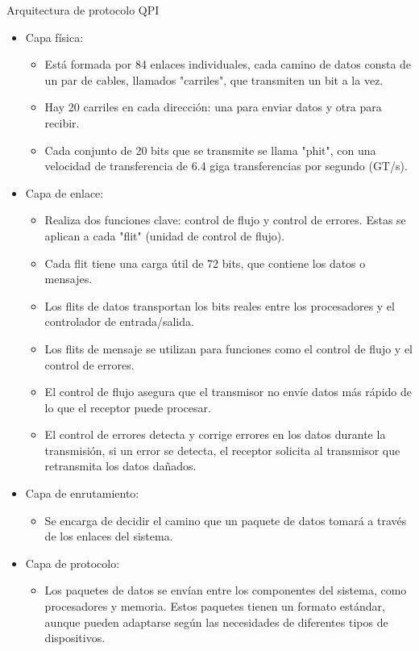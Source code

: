 \documentclass[presentation]{beamer}
\begin{document}
\begin{frame}[label={sec:org723b50a}]{Arquitectura de protocolo QPI}
\begin{itemize}
\item \alert{\alert{Capa física:}}
\begin{itemize}
\item Está formada por 84 enlaces individuales, cada camino de datos consta de un par de cables,
llamados "carriles", que transmiten un bit a la vez.
\item Hay 20 carriles en cada dirección: una para enviar datos y otra para recibir.
\item Cada conjunto de 20 bits que se transmite se llama "phit", con una velocidad de transferencia
de 6.4 giga transferencias por segundo (GT/s).
\end{itemize}
\item \alert{\alert{Capa de enlace:}}
\begin{itemize}
\item Realiza dos funciones clave: control de flujo y control de errores.
Estas se aplican a cada "flit" (unidad de control de flujo).
\item Cada flit tiene una carga útil de 72 bits, que contiene los datos o mensajes.
\item Los flits de datos transportan los bits reales entre los procesadores y el
controlador de entrada/salida.
\item Los flits de mensaje se utilizan para funciones como el control de flujo y
el control de errores.
\item El control de flujo asegura que el transmisor no envíe datos más rápido de
lo que el receptor puede procesar.
\item El control de errores detecta y corrige errores en los datos durante la
transmisión, si un error se detecta, el receptor solicita al transmisor
 que retransmita los datos dañados.
\end{itemize}
\item \alert{\alert{Capa de enrutamiento:}}
\begin{itemize}
\item Se encarga de decidir el camino que un paquete de datos tomará a través
de los enlaces del sistema.
\end{itemize}
\item \alert{\alert{Capa de protocolo:}}
\begin{itemize}
\item Los paquetes de datos se envían entre los componentes del sistema, como
procesadores y memoria. Estos paquetes tienen un formato estándar, aunque
      pueden adaptarse según las necesidades de diferentes tipos de dispositivos.
\end{itemize}
\end{itemize}
\end{frame}
\end{document}
